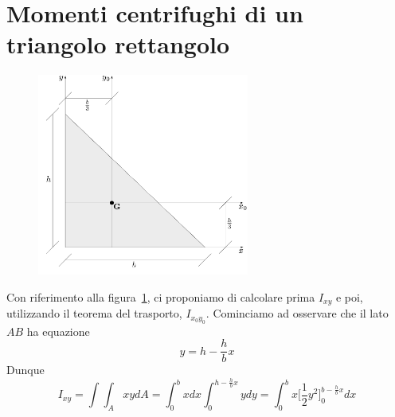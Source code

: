 \section{Momenti centrifughi di un triangolo rettangolo}
\renewcommand{\thefigure}{3~-~6}
\begin{figure}[ht]
\centering
\includegraphics[width=0.62\textwidth]{Immagini/Parte_3/Figura3_6/Figura3_6.pdf}
\caption{}
\label{figura3-6}
\end{figure}
\noindent Con riferimento alla figura~\ref{figura3-6}, ci proponiamo di calcolare prima $I_{xy}$ e poi, utilizzando il teorema del trasporto, $I_{x_{0}y_{0}}$. Cominciamo ad osservare che il lato $AB$ ha equazione
\begin{equation*}
y = h - \frac{h}{b}x
\end{equation*}
Dunque
\begin{equation*}
I_{xy} = \int\int_A xydA = \int_{0}^{b}xdx\int_{0}^{h-\frac{h}{b}x}\!\!\!\!ydy = \int_{0}^{b}x\Biggl[\frac{1}{2}y^2\Biggr]_{0}^{b-\frac{h}{b}x}\!\!\!\!\!\!\!\!\!\!\!\!dx
\end{equation*}
